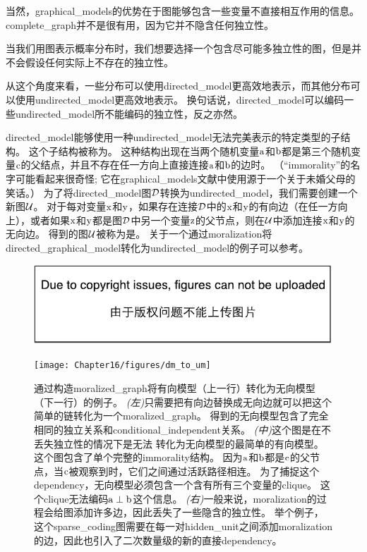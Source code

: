 当然，\gls{graphical_models}的优势在于图能够包含一些变量不直接相互作用的信息。 
\gls{complete_graph}并不是很有用，因为它并不隐含任何独立性。


当我们用图表示概率分布时，我们想要选择一个包含尽可能多独立性的图，但是并不会假设任何实际上不存在的独立性。


从这个角度来看，一些分布可以使用\gls{directed_model}更高效地表示，而其他分布可以使用\gls{undirected_model}更高效地表示。
换句话说，\gls{directed_model}可以编码一些\gls{undirected_model}所不能编码的独立性，反之亦然。


\gls{directed_model}能够使用一种\gls{undirected_model}无法完美表示的特定类型的子结构。
这个子结构被称为。
这种结构出现在当两个随机变量$\mathrm{a}$和$\mathrm{b}$都是第三个随机变量$\mathrm{c}$的父结点，并且不存在任一方向上直接连接$\mathrm{a}$和$\mathrm{b}$的边时。
（``\gls{immorality}''的名字可能看起来很奇怪; 它在\gls{graphical_models}文献中使用源于一个关于未婚父母的笑话。）
为了将\gls{directed_model}图$\mathcal{D}$转换为\gls{undirected_model}，我们需要创建一个新图$\mathcal{U}$。
对于每对变量$\mathrm{x}$和$\mathrm{y}$，如果存在连接$\mathcal{D}$中的$\mathrm{x}$和$\mathrm{y}$的有向边（在任一方向上），或者如果$\mathrm{x}$和$\mathrm{y}$都是图$\mathcal{D}$中另一个变量$\mathrm{z}$的父节点，则在$\mathcal{U}$中添加连接$\mathrm{x}$和$\mathrm{y}$的无向边。 
得到的图$\mathcal{U}$被称为是。
关于一个通过\gls{moralization}将\gls{directed_graphical_model}转化为\gls{undirected_model}的例子可以参考。


\begin{figure}[!htb]
\ifOpenSource
\centerline{\includegraphics{figure.pdf}}
\else
	\centerline{\texttt{[image: Chapter16/figures/dm\_to\_um]}}	
\fi
\caption{通过构造\gls{moralized_graph}将有向模型（上一行）转化为无向模型（下一行）的例子。
\emph{(左)}只需要把有向边替换成无向边就可以把这个简单的链转化为一个\gls{moralized_graph}。
得到的无向模型包含了完全相同的独立关系和\gls{conditional_independent}关系。
\emph{(中)}这个图是在不丢失独立性的情况下是无法
转化为无向模型的最简单的有向模型。
这个图包含了单个完整的\gls{immorality}结构。
因为$\mathrm{a}$和$\mathrm{b}$都是$\mathrm{c}$的父节点，当$\mathrm{c}$被观察到时，它们之间通过活跃路径相连。
为了捕捉这个\gls{dependency}，无向模型必须包含一个含有所有三个变量的\gls{clique}。
这个\gls{clique}无法编码$\mathrm{a} \perp \mathrm{b}$这个信息。
\emph{(右)}一般来说，\gls{moralization}的过程会给图添加许多边，因此丢失了一些隐含的独立性。
举个例子，这个\gls{sparse_coding}图需要在每一对\gls{hidden_unit}之间添加\gls{moralization}的边，因此也引入了二次数量级的新的直接\gls{dependency}。}
	\label{fig:dm_to_um}
\end{figure}



